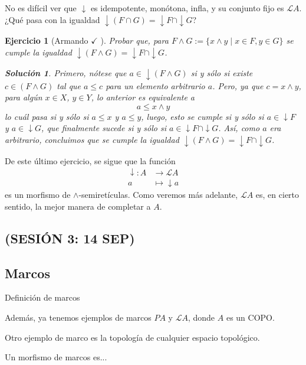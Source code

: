 \documentclass[12pt,letterpaper,titlepage]{article}
\newtheorem{exe}{Ejercicio}
\theoremstyle{definition}
\newtheorem*{sol}{Solución}
\newcommand\down{{\downarrow}}
\renewcommand\inf{\wedge}
\renewcommand\cal[1]{\mathcal{#1}}
\newcommand\<{\langle}
\renewcommand\>{\rangle}
\begin{document}
No es difícil ver que $\down$ es idempotente, monótona, infla, y su
conjunto fijo es $\cal LA$.
¿Qué pasa con la igualdad $\down(F\cap G)=\down F\cap\down G$?
\begin{exe}[Armando $\checkmark$ ]
  Probar que, para $F\inf G := \{x\inf y \mid x\in F, y\in G\}$ se cumple la igualdad $\down(F\inf G)= \down F\cap\down G $.
  \begin{sol}
      Primero, nótese que $a\in \downarrow(F\wedge G)$ si y sólo si existe $c\in (F\wedge G)$ tal que $a\leq c$ para un elemento arbitrario $a$. Pero, ya que $c=x\wedge y$, para algún $x\in X$, $y\in Y$, lo anterior es equivalente a $$a\leq x \wedge y$$ lo cuál pasa si y sólo si $a\leq x$ y $a\leq y$, luego, esto se cumple si y sólo si $a\in\downarrow F$ y $a\in\downarrow G$, que finalmente sucede si y sólo si $a\in \downarrow F \cap \downarrow G$.
      Así, como $a$ era arbitrario, concluimos que se cumple la igualdad $\downarrow(F\wedge G) = \downarrow F \cap \downarrow G$.
  \end{sol}
\end{exe}

De este último ejercicio, se sigue que la función
\begin{align*}
    \down : A&\to \cal LA \\
    a&\mapsto \down a
\end{align*}
es un morfismo de $\inf$-semiretículas.
Como veremos más adelante, $\cal LA$ es,
en cierto sentido, la mejor manera de completar a $A$.

\subsection*{(SESIÓN 3: 14 SEP)}
\subsection{Marcos}
Definición de marcos

Además, ya tenemos ejemplos de marcos $PA$ y $\cal LA$, donde $A$
es un COPO.

Otro ejemplo de marco es la topología de cualquier espacio
topológico.

Un morfismo de marcos es...
\end{document}
